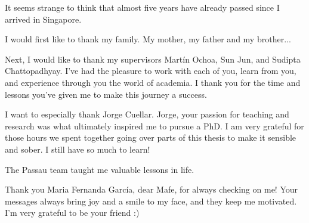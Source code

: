 \documentclass[
11pt, %
oneside, %
english, %
singlespacing, %
parskip, %
headsepline, %
]{MastersDoctoralThesis} %
\theoremstyle{definition}
\newcommand{\0}{{0_\TheCategoryOfSets}}
\newcommand{\1}{{1_\TheCategoryOfSets}}
\begin{document}
\begin{acknowledgements}
\addchaptertocentry{\acknowledgementname} %
It seems strange to think that almost five years have already passed since I arrived in Singapore. 

I would first like to thank my family. My mother, my father and my brother...

Next, I would like to thank my supervisors Mart\'in Ochoa, Sun Jun, and Sudipta Chattopadhyay. I've had the pleasure to work with each of you, learn from you, and experience through you the world of academia. I thank you for the time and lessons you've given me to make this journey a success. 

I want to especially thank Jorge Cuellar. Jorge, your passion for teaching and research was what ultimately inspired me to pursue a PhD. I am very grateful for those hours we spent together going over parts of this thesis to make it sensible and sober. I still have so much to learn! 

The Passau team taught me valuable lessons in life.




 







Thank you Maria Fernanda García, dear Mafe, for always checking on me! Your messages always bring joy and a smile to my face, and they keep me motivated. I'm very grateful to be your friend :) 

\end{acknowledgements}


\tableofcontents %
\end{document}
